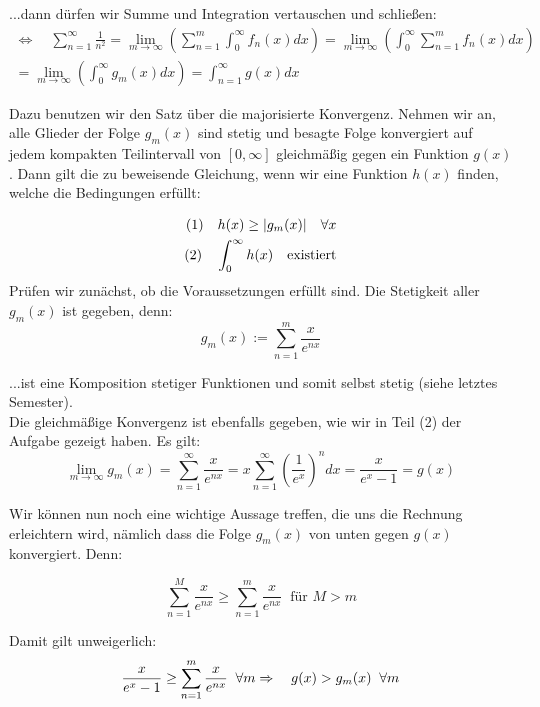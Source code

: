 \documentclass[a4paper,german,12pt,smallheadings]{scrartcl}
\begin{document}
...dann dürfen wir Summe und Integration vertauschen und schließen:
\begin{align*}
\Leftrightarrow \quad \sum_{n=1}^{\infty}\frac{1}{n^2}=\lim\limits_{m \to \infty}\left(\sum_{n=1}^{m}\int_{0}^{\infty}f_n(x)dx\right)=\lim\limits_{m \to \infty}\left(\int_{0}^{\infty}\sum_{n=1}^{m}f_n(x)dx\right)\\
=\lim\limits_{m \to \infty}\left(\int_{0}^{\infty}g_m(x)dx\right)=\int_{n=1}^{\infty}g(x)dx
\end{align*}

Dazu benutzen wir den Satz über die majorisierte Konvergenz. Nehmen wir an, alle Glieder der Folge $g_m(x)$ sind stetig und besagte Folge konvergiert auf jedem kompakten Teilintervall von $[0,\infty]$ gleichmäßig gegen ein Funktion $g(x)$. Dann gilt die zu beweisende Gleichung, wenn wir eine Funktion $h(x)$ finden, welche die Bedingungen erfüllt:

\begin{align*}
(1)\quad h(x)\geq |g_m(x)| \quad \forall x\\
(2)\quad \int_{0}^{\infty}h(x) \text \quad \text{existiert}
\end{align*}
Prüfen wir zunächst, ob die Voraussetzungen erfüllt sind. Die Stetigkeit aller $g_m(x)$ ist gegeben, denn:
\begin{equation*}
g_m(x):=\sum_{n=1}^{m}\frac{x}{e^{nx}}
\end{equation*}

...ist eine Komposition stetiger Funktionen und somit selbst stetig (siehe letztes Semester).\\
Die gleichmäßige Konvergenz ist ebenfalls gegeben, wie wir in Teil (2) der Aufgabe gezeigt haben. Es gilt:
\begin{equation*}
\lim\limits_{m \to \infty} g_m(x)=\sum_{n=1}^{\infty}\frac{x}{e^{nx}}=x\sum_{n=1}^{\infty}\left(\frac{1}{e^x}\right)^ndx=\frac{x}{e^x-1}=g(x)
\end{equation*}

Wir können nun noch eine wichtige Aussage treffen, die uns die Rechnung erleichtern wird, nämlich dass die Folge $g_m(x)$ von unten gegen $g(x)$ konvergiert. Denn:

\begin{equation*}
\sum_{n=1}^{M}\frac{x}{e^{nx}} \ge \sum_{n=1}^{m}\frac{x}{e^{nx}} \;\; \text{für $M>m$}
\end{equation*}

Damit gilt unweigerlich:
\begin{equation*}
\frac{x}{e^x-1} \ge \sum_{n=1}^{m}\frac{x}{e^{nx}} \;\; \forall m\\
\Rightarrow \quad g(x)>g_m(x) \;\; \forall m
\end{equation*}
\end{document}
